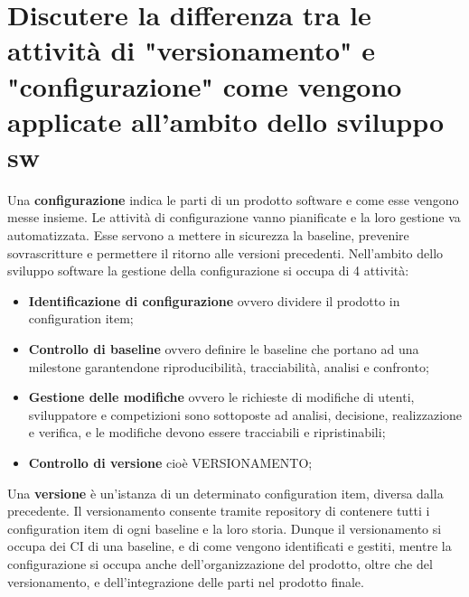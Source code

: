 \section{Discutere la differenza tra le attività di "versionamento" e "configurazione" come vengono applicate all'ambito dello sviluppo sw}
Una \textbf{configurazione} indica le parti di un prodotto software e come esse vengono messe insieme. Le attività di configurazione vanno pianificate e la loro gestione va automatizzata. Esse servono a mettere in sicurezza la baseline, prevenire sovrascritture e permettere il ritorno alle versioni precedenti.
Nell'ambito dello sviluppo software la gestione della configurazione si occupa di 4 attività:
\begin{itemize}
	\item \textbf{Identificazione di configurazione} ovvero dividere il prodotto in configuration item;
	\item \textbf{Controllo di baseline} ovvero definire le baseline che portano ad una milestone garantendone riproducibilità, tracciabilità, analisi e confronto;
	\item \textbf{Gestione delle modifiche} ovvero le richieste di modifiche di utenti, sviluppatore e competizioni sono sottoposte ad analisi, decisione, realizzazione e verifica, e le modifiche devono essere tracciabili e ripristinabili;
\item \textbf{Controllo di versione} cioè VERSIONAMENTO;
	\end{itemize}
Una \textbf{versione} è un'istanza di un determinato configuration item, diversa dalla precedente. Il versionamento consente tramite repository di contenere tutti i configuration item di ogni baseline e la loro storia.
Dunque il versionamento si occupa dei CI di una baseline, e di come vengono identificati e gestiti, mentre la configurazione si occupa anche dell'organizzazione del prodotto, oltre che del versionamento, e dell'integrazione delle parti nel prodotto finale.